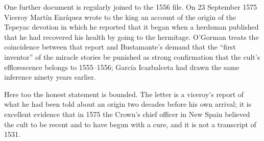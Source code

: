 One further document is regularly joined to the 1556 file. On 23
September 1575 Viceroy Mart\'in Enr\'iquez wrote to the king an
account of the origin of the Tepeyac devotion in which he reported
that it began when a herdsman published that he had recovered his
health by going to the hermitage. O'Gorman treats the coincidence
between that report and Bustamante's demand that the ``first
inventor'' of the miracle stories be punished as strong confirmation
that the cult's efflorescence belongs to 1555--1556; Garc\'ia
Icazbalceta had drawn the same inference ninety years
earlier.

Here too the honest statement is bounded. The letter is a viceroy's
report of what he had been told about an origin two decades before
his own arrival; it is excellent evidence that in 1575 the Crown's
chief officer in New Spain believed the cult to be recent and to have
begun with a cure, and it is not a transcript of 1531.
